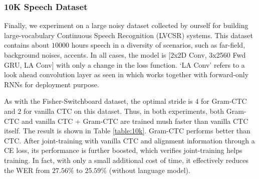 \documentclass{article}
\begin{document}


\subsubsection{10K Speech Dataset}

Finally, we experiment on a large noisy dataset collected by ourself for building large-vocabulary Continuous Speech Recognition (LVCSR) systems. This dataset contains about $10000$ hours speech in a diversity of scenarios, such as far-field, background noises, accents.  In all cases, the model is [2x2D Conv, 3x2560 Fwd GRU, LA Conv] with only a change in the loss function. `LA Conv' refers to a look ahead convolution layer as seen in \cite{amodei2015deep} which works together with forward-only RNNs for deployment purpose. 

As with the Fisher-Switchboard dataset, the optimal stride is $4$ for Gram-CTC and $2$ for vanilla CTC on this dataset. Thus, in both experiments, both Gram-CTC and vanilla CTC + Gram-CTC are trained mush faster than vanilla CTC itself. The result is shown in Table \ref{table:10k}. Gram-CTC performs better than CTC. After joint-training with vanilla CTC and alignment information through a CE loss, its performance is further boosted, which verifies joint-training helps training. In fact, with only a small additional cost of time, it effectively reduces the WER from $27.56\%$ to $25.59\%$ (without language model).

\end{document}

